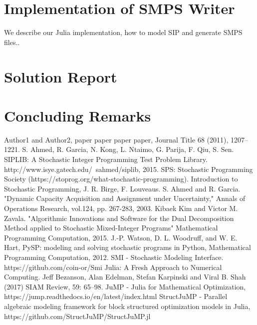 \section{Implementation of SMPS Writer}

We describe our Julia implementation, how to model SIP and generate SMPS files..

\section{Solution Report}

\section{Concluding Remarks}


\begin{thebibliography}{9} 
	Author1 and Author2, paper paper paper paper, Journal Title 68 (2011), 1207--1221.
	S. Ahmed, R. Garcia, N. Kong, L. Ntaimo, G. Parija, F. Qiu, S. Sen. SIPLIB: A Stochastic Integer Programming Test Problem Library. http://www.isye.gatech.edu/~sahmed/siplib, 2015.
	SPS: Stochastic Programming Society (https://stoprog.org/what-stochastic-programming).
	Introduction to Stochastic Programming, J. R. Birge, F. Louveaus.
	S. Ahmed and R. Garcia. "Dynamic Capacity Acquisition and Assignment under Uncertainty," Annals of Operations Research, vol.124, pp. 267-283, 2003.
	Kibaek Kim and Victor M. Zavala. "Algorithmic Innovations and Software for the Dual Decomposition Method applied to Stochastic Mixed-Integer Programs" Mathematical Programming Computation, 2015.
	J.-P. Watson, D. L. Woodruff, and W. E. Hart, PySP: modeling and solving stochastic programs in Python, Mathematical Programming Computation, 2012.
	SMI - Stochastic Modeling Interface. https://github.com/coin-or/Smi
	Julia: A Fresh Approach to Numerical Computing. Jeff Bezanson, Alan Edelman, Stefan Karpinski and Viral B. Shah (2017) SIAM Review, 59: 65–98.
	JuMP - Julia for Mathematical Optimization, https://jump.readthedocs.io/en/latest/index.html
	StructJuMP - Parallel algebraic modeling framework for block structured optimization models in Julia, https://github.com/StructJuMP/StructJuMP.jl
\end{thebibliography}


